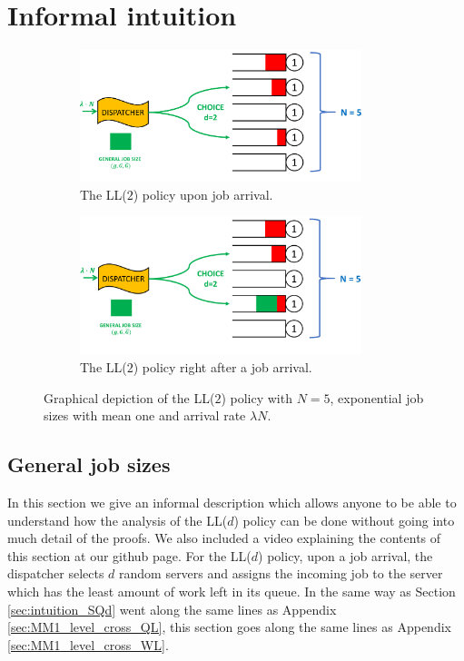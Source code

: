 \documentclass[12pt]{report}
\begin{document}
\section{Informal intuition}\label{sec:LLd_intuition}
\begin{figure}[t]
\begin{subfigure}{.45\textwidth}
\centering
\includegraphics[width=0.9\textwidth]{figures/Chapter2/LLd.PNG}
\caption{The LL($2$) policy upon job arrival.}
\label{fig:LL2_pre}
\end{subfigure}
\begin{subfigure}{.45\textwidth}
\centering
\includegraphics[width=0.9\textwidth]{figures/Chapter2/LLd2.PNG}
\caption{The LL($2$) policy right after a job arrival.}
\label{fig:LL2_post}
\end{subfigure}
\caption{Graphical depiction of the LL($2$) policy with $N=5$, exponential job sizes with mean one and arrival rate $\lambda N$.}\label{fig:LL2}
\end{figure}

\subsection{General job sizes}
In this section we give an informal description which allows anyone to be able to understand how the analysis of the LL($d$) policy can be done without going into much detail of the proofs. We also included a video explaining the contents of this section at our github page. For the LL($d$) policy, upon a job arrival, the dispatcher selects $d$ random servers and assigns the incoming job to the server which has the least amount of work left in its queue. In the same way as Section \ref{sec:intuition_SQd} went along the same lines as Appendix \ref{sec:MM1_level_cross_QL}, this section goes along the same lines as Appendix \ref{sec:MM1_level_cross_WL}.
\end{document}
